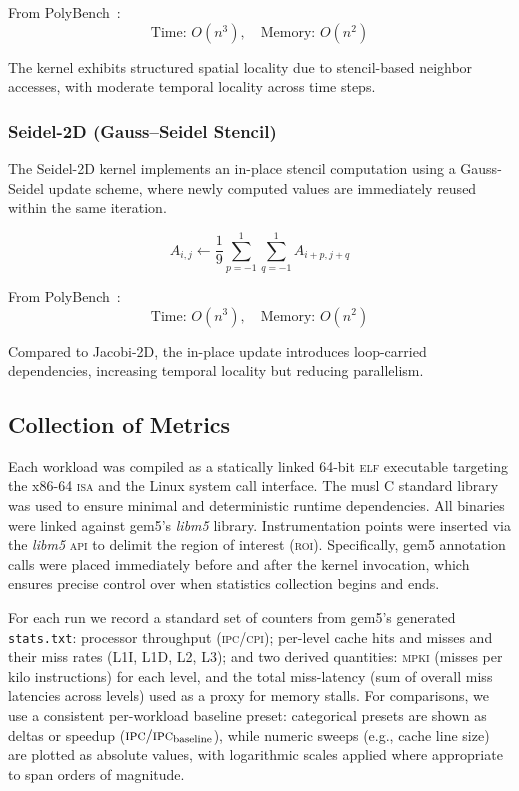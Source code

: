 \documentclass[conference]{IEEEtran}
\begin{document}
From PolyBench~\cite{polybench:2016}:
\[
\text{Time: } O(n^3), \quad \text{Memory: } O(n^2)
\]

The kernel exhibits structured spatial locality due to stencil-based neighbor
accesses, with moderate temporal locality across time steps.

\subsubsection{Seidel-2D (Gauss--Seidel Stencil)} The Seidel-2D kernel
implements an in-place stencil computation using a Gauss-Seidel update scheme,
where newly computed values are immediately reused within the same iteration.

\[
A_{i,j} \leftarrow \frac{1}{9}
\sum_{p=-1}^{1} \sum_{q=-1}^{1} A_{i+p,j+q}
\]

From PolyBench~\cite{polybench:2016}:
\[
\text{Time: } O(n^3), \quad \text{Memory: } O(n^2)
\]

Compared to Jacobi-2D, the in-place update introduces loop-carried
dependencies, increasing temporal locality but reducing
parallelism.\cite{golub:2013}

\subsection{Collection of Metrics}

Each workload was compiled as a statically linked 64-bit \textsc{elf}
executable targeting the x86-64 \textsc{isa} and the Linux system call
interface. The musl C standard library~\cite{musl} was used to ensure minimal
and deterministic runtime dependencies. All binaries were linked against gem5's
\textit{libm5} library. Instrumentation points were inserted via the
\textit{libm5} \textsc{api} to delimit the region of interest (\textsc{roi}).
Specifically, gem5 annotation calls were placed immediately before and after
the kernel invocation, which ensures precise control over when statistics
collection begins and ends.

For each run we record a standard set of counters from gem5's generated
\texttt{stats.txt}: processor throughput (\textsc{ipc}/\textsc{cpi}); per-level
cache hits and misses and their miss rates (L1I, L1D, L2, L3); and two derived
quantities: \textsc{mpki} (misses per kilo instructions) for each level, and
the total miss-latency (sum of overall miss latencies across levels) used as a
proxy for memory stalls. For comparisons, we use a consistent per-workload
baseline preset: categorical presets are shown as deltas or speedup
(\(\mathrm{\textsc{ipc}}/\mathrm{\textsc{ipc}}_{\text{baseline}}\)), while
numeric sweeps (e.g., cache line size) are plotted as absolute values, with
logarithmic scales applied where appropriate to span orders of magnitude.
\end{document}
